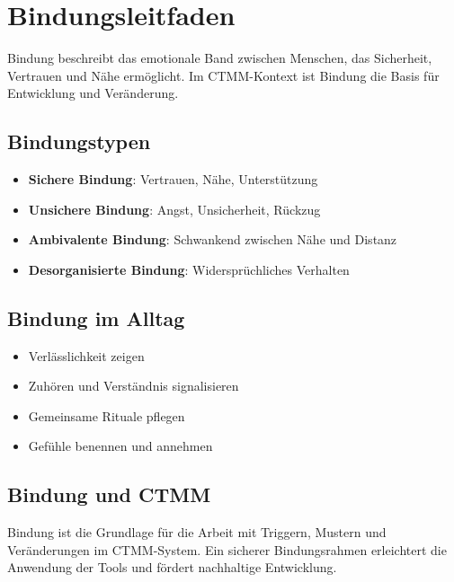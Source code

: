 \section{Bindungsleitfaden}
\begin{tcolorbox}[colback=ctmmBlue!5!white,colframe=ctmmBlue,title=Was ist Bindung?]
Bindung beschreibt das emotionale Band zwischen Menschen, das Sicherheit, Vertrauen und Nähe ermöglicht. Im CTMM-Kontext ist Bindung die Basis für Entwicklung und Veränderung.
\end{tcolorbox}

\subsection{Bindungstypen}
\begin{itemize}
  \item \textbf{Sichere Bindung}: Vertrauen, Nähe, Unterstützung
  \item \textbf{Unsichere Bindung}: Angst, Unsicherheit, Rückzug
  \item \textbf{Ambivalente Bindung}: Schwankend zwischen Nähe und Distanz
  \item \textbf{Desorganisierte Bindung}: Widersprüchliches Verhalten
\end{itemize}

\subsection{Bindung im Alltag}
\begin{tcolorbox}[colback=ctmmGreen!5!white,colframe=ctmmGreen,title=Bindung stärken]
\begin{itemize}
  \item Verlässlichkeit zeigen
  \item Zuhören und Verständnis signalisieren
  \item Gemeinsame Rituale pflegen
  \item Gefühle benennen und annehmen
\end{itemize}
\end{tcolorbox}

\subsection{Bindung und CTMM}
Bindung ist die Grundlage für die Arbeit mit Triggern, Mustern und Veränderungen im CTMM-System. Ein sicherer Bindungsrahmen erleichtert die Anwendung der Tools und fördert nachhaltige Entwicklung.
